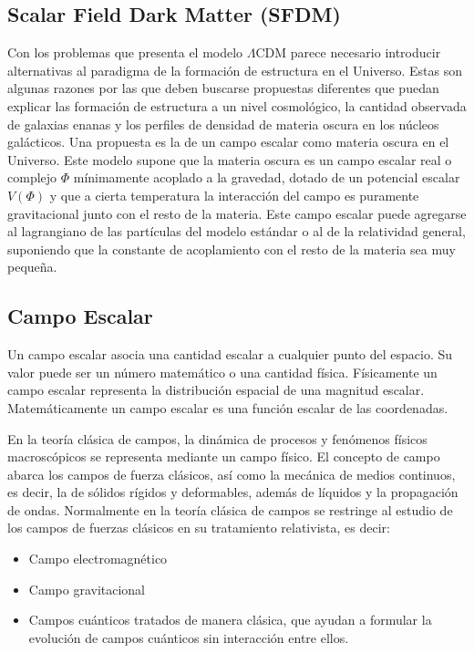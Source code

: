\documentclass[a4paper,openright,12pt]{book}
\begin{document}
\subsection{Scalar Field Dark Matter (SFDM)}
Con los problemas que presenta el modelo $\Lambda$CDM parece necesario introducir alternativas al paradigma de la formación de estructura en el Universo. Estas son algunas razones por las que deben buscarse propuestas diferentes que puedan explicar las formación de estructura a un nivel cosmológico, la cantidad observada de galaxias enanas y los perfiles de densidad de materia oscura en los núcleos galácticos.
Una propuesta es la de un campo escalar como materia oscura en el Universo. Este modelo supone que la materia oscura es un campo escalar real o complejo $\Phi$ mínimamente acoplado a la gravedad, dotado de un potencial escalar $V(\Phi)$ y que a cierta temperatura la interacción  del campo es puramente gravitacional junto con el resto de la materia. Este campo escalar puede agregarse al lagrangiano de las partículas del modelo estándar o al de la relatividad general, suponiendo que la constante de acoplamiento con el resto de la materia sea muy pequeña.

\subsection*{Campo Escalar}
Un campo escalar asocia una cantidad escalar a cualquier punto del espacio. Su valor puede ser un número matemático o una cantidad física. Físicamente un campo escalar representa la distribución espacial de una magnitud escalar. Matemáticamente un campo escalar es una función escalar de las coordenadas.

En la teoría clásica de campos, la dinámica de procesos y fenómenos físicos macroscópicos se representa mediante un campo físico. El concepto de campo abarca los campos de fuerza clásicos, así como la mecánica de medios continuos, es decir, la de sólidos rígidos y deformables, además de líquidos y la propagación de ondas. Normalmente en la teoría clásica de campos se restringe al estudio de los campos de fuerzas clásicos en su tratamiento relativista, es decir: 
\begin{itemize}
\item Campo electromagnético
\item Campo gravitacional
\item Campos cuánticos tratados de manera clásica, que ayudan a formular la evolución de campos cuánticos sin interacción entre ellos.
\end{itemize}
\end{document}
